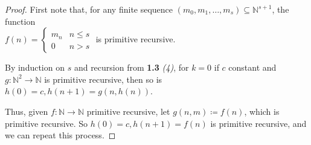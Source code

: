 \documentclass[10pt,a4paper]{article}
\newcommand{\N}{\mathbb{N}}
\begin{document}
\begin{proof}
First note that, for any finite sequence $(m_0, m_1, \ldots, m_s)\subseteq\N^{s+1}$, the function\\ $f(n) = \begin{cases} m_n &n\leq s \\ 0 & n>s \end{cases}$ is primitive recursive.

By induction on $s$ and recursion from \textbf{1.3} \textit{(4)}, for $k=0$ if $c$ constant and $g:\N^2 \rightarrow \N$ is primitive recursive, then so is $h(0) = c, h(n+1) = g(n, h(n))$.

Thus, given $f:\N\rightarrow\N$ primitive recursive, let $g(n,m) \coloneqq f(n)$, which is primitive recursive. So $h(0)=c, h(n+1)=f(n)$ is primitive recursive, and we can repeat this process. 


\end{proof}
\end{document}
